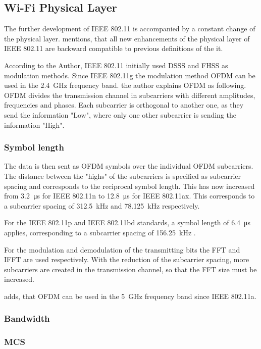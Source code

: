 \subsection*{Wi-Fi Physical Layer}
The further development of IEEE 802.11 is accompanied by a constant change of the physical layer. \textcite{sauter_wireless_2022} mentions, that all new enhancements of the physical layer of IEEE 802.11 are backward compatible to previous definitions of the it.

According to the Author, IEEE 802.11 initially used DSSS and FHSS as modulation methods.
Since IEEE 802.11g the modulation method \ac{OFDM} can be used in the \SI{2.4}{\giga\hertz} frequency band. the author explains \ac{OFDM} as following. \ac{OFDM} divides the transmission channel in subcarriers with different amplitudes, frequencies and phases. Each subcarrier is orthogonal to another one, as they send the information "Low", where only one other subcarrier is sending the information "High". 

\subsubsection*{Symbol length}
The data is then sent as \ac{OFDM} symbols over the individual \ac{OFDM} subcarriers. The distance between the "highs" of the subcarriers is specified as subcarrier spacing and corresponds to the reciprocal symbol length. This has now increased from \SI{3.2}{\micro\second} for IEEE 802.11n to \SI{12.8}{\micro\second} for IEEE 802.11ax. This corresponds to a subcarrier spacing of \SI{312.5}{\kilo\hertz} and \SI{78.125}{\kilo\hertz} respectively. 

For the IEEE 802.11p and IEEE 802.11bd standards, a symbol length of \SI{6.4}{\micro\second} applies, corresponding to a subcarrier spacing of \SI{156.25}{\kilo\hertz} \cite{jacob_system-level_2020}.

For the modulation and demodulation of the transmitting bits the FFT and IFFT are used respectively. With the reduction of the subcarrier spacing, more subcarriers are created in the transmission channel, so that the FFT size must be increased. 

\textcite{kauffels_wireless_2002} adds, that \ac{OFDM} can be used in the \SI{5}{\giga\hertz} frequency band since IEEE 802.11a. 
\subsubsection*{Bandwidth}
\subsubsection*{\acl{MCS}}

